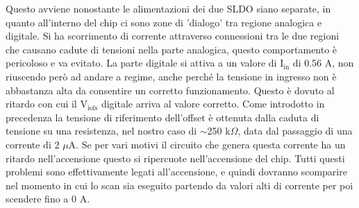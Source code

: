 Questo avviene nonostante le alimentazioni dei due SLDO siano separate, in quanto all'interno del chip ci sono zone di 'dialogo' tra regione analogica e digitale. 
Si ha scorrimento di corrente attraverso connessioni tra le due regioni che causano cadute di tensioni nella parte analogica, questo comportamento è pericoloso e va evitato. 
La parte digitale si attiva a un valore di $\mathrm{I_{in}}$ di 0.56 A, non riuscendo però ad andare a regime, anche perché la tensione in ingresso non è abbastanza alta da consentire un corretto funzionamento.
Questo è dovuto al ritardo con cui il $\mathrm{V_{iofs}}$ digitale arriva al valore corretto. Come introdotto in precedenza la tensione di riferimento dell'offset è ottenuta dalla caduta di tensione su una resistenza, nel nostro caso di $\sim$250 k$\Omega$, data dal passaggio di una corrente di 2 $\mu$A. Se per vari motivi il circuito che genera questa corrente ha un ritardo nell'accensione questo si ripercuote nell'accensione del chip.  
Tutti questi problemi sono effettivamente legati all'accensione, e quindi dovranno scomparire nel momento in cui lo scan sia eseguito partendo da valori alti di corrente per poi scendere fino a 0 A.

% 
%
%


